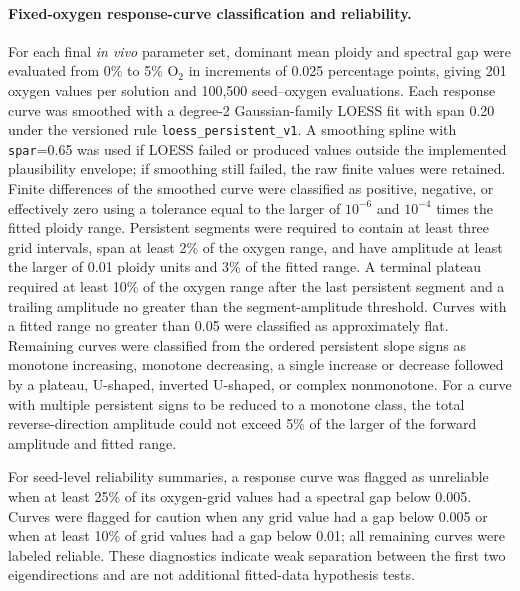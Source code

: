 \documentclass[11pt]{article}
\begin{document}
\paragraph{Fixed-oxygen response-curve classification and reliability.}
For each final \textit{in vivo} parameter set, dominant mean ploidy and spectral gap were evaluated from 0\% to 5\% O$_2$ in increments of 0.025 percentage points, giving 201 oxygen values per solution and 100,500 seed--oxygen evaluations. Each response curve was smoothed with a degree-2 Gaussian-family LOESS fit with span 0.20 under the versioned rule \texttt{loess\_persistent\_v1}. A smoothing spline with \texttt{spar}=0.65 was used if LOESS failed or produced values outside the implemented plausibility envelope; if smoothing still failed, the raw finite values were retained. Finite differences of the smoothed curve were classified as positive, negative, or effectively zero using a tolerance equal to the larger of $10^{-6}$ and $10^{-4}$ times the fitted ploidy range. Persistent segments were required to contain at least three grid intervals, span at least 2\% of the oxygen range, and have amplitude at least the larger of 0.01 ploidy units and 3\% of the fitted range. A terminal plateau required at least 10\% of the oxygen range after the last persistent segment and a trailing amplitude no greater than the segment-amplitude threshold. Curves with a fitted range no greater than 0.05 were classified as approximately flat. Remaining curves were classified from the ordered persistent slope signs as monotone increasing, monotone decreasing, a single increase or decrease followed by a plateau, U-shaped, inverted U-shaped, or complex nonmonotone. For a curve with multiple persistent signs to be reduced to a monotone class, the total reverse-direction amplitude could not exceed 5\% of the larger of the forward amplitude and fitted range.

For seed-level reliability summaries, a response curve was flagged as unreliable when at least 25\% of its oxygen-grid values had a spectral gap below 0.005. Curves were flagged for caution when any grid value had a gap below 0.005 or when at least 10\% of grid values had a gap below 0.01; all remaining curves were labeled reliable. These diagnostics indicate weak separation between the first two eigendirections and are not additional fitted-data hypothesis tests.
\end{document}
